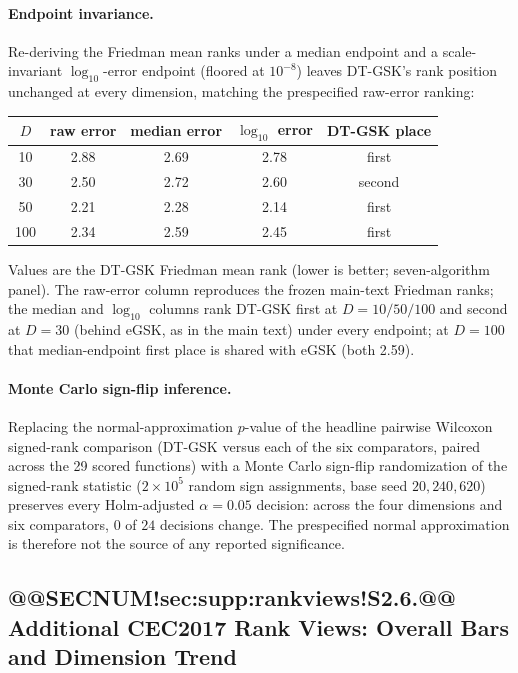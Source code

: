 \documentclass[10pt,a4paper]{article}
\newcommand{\dtgsk}{DT-GSK}
\newcommand{\egsk}{eGSK}
\begin{document}
\paragraph{Endpoint invariance.}
Re-deriving the Friedman mean ranks under a median endpoint and a
scale-invariant $\log_{10}$-error endpoint (floored at $10^{-8}$) leaves
\dtgsk{}'s rank position unchanged at every dimension, matching the
prespecified raw-error ranking:
\begin{center}
\small
\begin{tabular}{ccccc}
\toprule
$D$ & raw error & median error & $\log_{10}$ error & \dtgsk{} place\\
\midrule
10  & 2.88 & 2.69 & 2.78 & first\\
30  & 2.50 & 2.72 & 2.60 & second\\
50  & 2.21 & 2.28 & 2.14 & first\\
100 & 2.34 & 2.59 & 2.45 & first\\
\bottomrule
\end{tabular}
\end{center}

Values are the \dtgsk{} Friedman mean rank (lower is better; seven-algorithm
panel).  The raw-error column reproduces the frozen main-text Friedman ranks;
the median and $\log_{10}$ columns rank \dtgsk{} first at $D=10/50/100$ and
second at $D=30$ (behind \egsk{}, as in the main text) under every endpoint;
at $D=100$ that median-endpoint first place is shared with \egsk{} (both 2.59).

\paragraph{Monte Carlo sign-flip inference.}
Replacing the normal-approximation $p$-value of the headline pairwise Wilcoxon
signed-rank comparison (\dtgsk{} versus each of the six comparators, paired
across the 29 scored functions) with a Monte Carlo sign-flip randomization of the
signed-rank statistic ($2\times10^{5}$ random sign assignments, base seed $20{,}240{,}620$)
preserves every Holm-adjusted $\alpha=0.05$ decision: across the four dimensions
and six comparators, $0$ of $24$ decisions change.  The prespecified normal
approximation is therefore not the source of any reported significance.



\subsection{@@SECNUM!sec:supp:rankviews!S2.6.@@ Additional CEC2017 Rank Views: Overall Bars and Dimension Trend}\label{sec:supp:rankviews}
\end{document}
